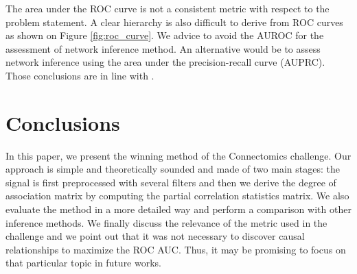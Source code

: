 \documentclass[wcp]{jmlr}
\begin{document}
The area under the ROC curve is not a consistent metric with respect to the
problem statement. A clear hierarchy is also difficult to derive from ROC
curves as shown on Figure \ref{fig:roc_curve}. We advice to avoid the AUROC for
the assessment of network inference method. An alternative would be to assess
network inference using the area under the precision-recall curve (AUPRC).
Those conclusions are in line with \cite{schrynemackers2013protocols}.


\section{Conclusions} \label{sec:conclusion}





In this paper, we present the winning method of the Connectomics challenge. Our
approach is simple and theoretically sounded and made of two main stages: the
signal is first preprocessed with several filters and then we derive the degree
of association matrix by computing the partial correlation statistics matrix.
We also evaluate the method in a more detailed way and perform a comparison
with other inference methods. We finally discuss the relevance of the metric
used in the challenge and we point out that it was not necessary to discover
causal relationships to maximize the ROC AUC. Thus, it may be  promising to
focus on that particular topic in future works.


\end{document}
